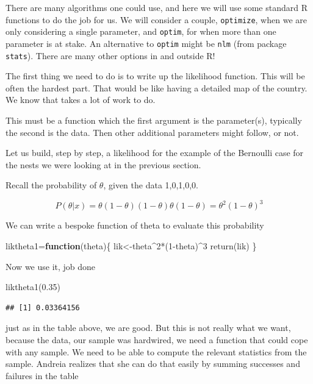 \documentclass[
]{book}
\newenvironment{Shaded}{\begin{snugshade}}{\end{snugshade}}
\newcommand{\ControlFlowTok}[1]{\textcolor[rgb]{0.13,0.29,0.53}{\textbf{#1}}}
\newcommand{\DecValTok}[1]{\textcolor[rgb]{0.00,0.00,0.81}{#1}}
\newcommand{\FloatTok}[1]{\textcolor[rgb]{0.00,0.00,0.81}{#1}}
\newcommand{\FunctionTok}[1]{\textcolor[rgb]{0.00,0.00,0.00}{#1}}
\newcommand{\NormalTok}[1]{#1}
\newcommand{\OtherTok}[1]{\textcolor[rgb]{0.56,0.35,0.01}{#1}}
\newcommand{\SpecialCharTok}[1]{\textcolor[rgb]{0.00,0.00,0.00}{#1}}
\begin{document}
There are many algorithms one could use, and here we will use some standard R functions to do the job for us. We will consider a couple, \texttt{optimize}, when we are only considering a single parameter, and \texttt{optim}, for when more than one parameter is at stake. An alternative to \texttt{optim} might be \texttt{nlm} (from package \texttt{stats}). There are many other options in and outside R!

The first thing we need to do is to write up the likelihood function. This will be often the hardest part. That would be like having a detailed map of the country. We know that takes a lot of work to do.

This must be a function which the first argument is the parameter(s), typically the second is the data. Then other additional parameters might follow, or not.

Let us build, step by step, a likelihood for the example of the Bernoulli case for the nests we were looking at in the previous section.

Recall the probability of \(\theta\), given the data 1,0,1,0,0.

\[P(\theta|x)=\theta (1-\theta) (1-\theta) \theta (1-\theta)=\theta^2 (1-\theta)^3\]

We can write a bespoke function of theta to evaluate this probability

\begin{Shaded}
\begin{Highlighting}[]
\NormalTok{liktheta1}\OtherTok{=}\ControlFlowTok{function}\NormalTok{(theta)\{}
\NormalTok{  lik}\OtherTok{\textless{}{-}}\NormalTok{theta}\SpecialCharTok{\^{}}\DecValTok{2}\SpecialCharTok{*}\NormalTok{(}\DecValTok{1}\SpecialCharTok{{-}}\NormalTok{theta)}\SpecialCharTok{\^{}}\DecValTok{3}
  \FunctionTok{return}\NormalTok{(lik)}
\NormalTok{\}}
\end{Highlighting}
\end{Shaded}

Now we use it, job done

\begin{Shaded}
\begin{Highlighting}[]
\FunctionTok{liktheta1}\NormalTok{(}\FloatTok{0.35}\NormalTok{)}
\end{Highlighting}
\end{Shaded}

\begin{verbatim}
## [1] 0.03364156
\end{verbatim}

just as in the table above, we are good. But this is not really what we want, because the data, our sample was hardwired, we need a function that could cope with any sample. We need to be able to compute the relevant statistics from the sample. Andreia realizes that she can do that easily by summing successes and failures in the table
\end{document}
